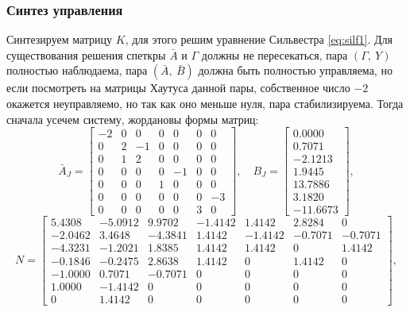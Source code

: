 \subsubsection{Синтез управления}
\label{sec:reg2}

Синтезируем матрицу $K$, для
этого решим уравнение Сильвестра \eqref{eq:silf1}.
Для существования решения спеткры $\bar A$ и $\Gamma$ должны не пересекаться, 
пара $(\Gamma,\ Y)$ полностью наблюдаема,
пара $(\bar A,\ \bar B)$ должна быть полностью управляема,
но если посмотреть на матрицы Хаутуса данной пары, собственное число $-2$
окажется неуправляемо, но так как оно меньше нуля, пара стабилизируема.
Тогда сначала усечем систему, жордановы формы матриц:
\begin{equation*}
    \bar A_J=\begin{bmatrix}
       -2 &  0 &  0 &  0 &  0 &  0 &  0 \\
        0 &  2 & -1 &  0 &  0 &  0 &  0 \\
        0 &  1 &  2 &  0 &  0 &  0 &  0 \\
        0 &  0 &  0 &  0 & -1 &  0 &  0 \\
        0 &  0 &  0 &  1 &  0 &  0 &  0 \\
        0 &  0 &  0 &  0 &  0 &  0 & -3 \\
        0 &  0 &  0 &  0 &  0 &  3 &  0
       \end{bmatrix},\quad
       B_J=\begin{bmatrix}
          0.0000 \\
          0.7071 \\
         -2.1213 \\
          1.9445 \\
         13.7886 \\
          3.1820 \\
        -11.6673
       \end{bmatrix},
\end{equation*}
\begin{equation*}
    N=\begin{bmatrix}
       5.4308 & -5.0912 &  9.9702 & -1.4142 &  1.4142 &  2.8284 &  0      \\
      -2.0462 &  3.4648 & -4.3841 &  1.4142 & -1.4142 & -0.7071 & -0.7071 \\
      -4.3231 & -1.2021 &  1.8385 &  1.4142 &  1.4142 &  0      &  1.4142 \\
      -0.1846 & -0.2475 &  2.8638 &  1.4142 &  0      &  1.4142 &  0      \\
      -1.0000 &  0.7071 & -0.7071 &  0      &  0      &  0      &  0      \\
       1.0000 & -1.4142 &  0      &  0      &  0      &  0      &  0      \\
       0      &  1.4142 &  0      &  0      &  0      &  0      &  0
       \end{bmatrix},
\end{equation*}
